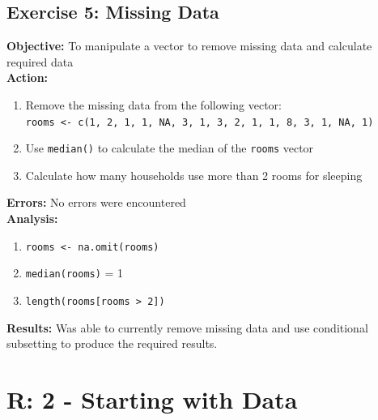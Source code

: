 \documentclass{article}
\begin{document}
\subsection{Exercise 5: Missing Data}
\textbf{Objective:} To manipulate a vector to remove missing data and calculate required data\\
\textbf{Action:}
\begin{enumerate}
    \item Remove the missing data from the following vector:\\
    \verb|rooms <- c(1, 2, 1, 1, NA, 3, 1, 3, 2, 1, 1, 8, 3, 1, NA, 1)|
    \item Use \verb|median()| to calculate the median of the \verb|rooms| vector
    \item Calculate how many households use more than 2 rooms for sleeping
\end{enumerate}
\textbf{Errors:} No errors were encountered\\
\textbf{Analysis:}
\begin{enumerate}
    \item \verb|rooms <- na.omit(rooms)|
    \item \verb|median(rooms)| = 1
    \item \verb|length(rooms[rooms > 2])|
\end{enumerate}
\textbf{Results:} Was able to currently remove missing data and use conditional subsetting to produce the required results.

\section{R: 2 - Starting with Data}
\end{document}
